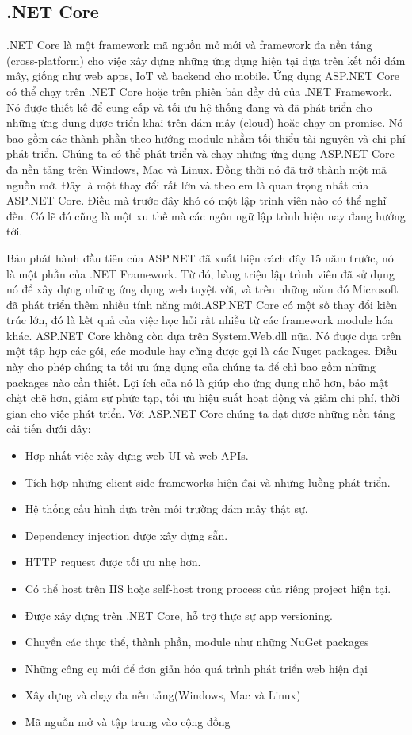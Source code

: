\subsection{.NET Core}
.NET Core là một framework mã nguồn mở mới và framework đa nền tảng (cross-platform) cho việc xây dựng những ứng dụng hiện tại dựa trên kết nối đám mây, giống như web apps, IoT và backend cho mobile. Ứng dụng ASP.NET Core có thể chạy trên .NET Core hoặc trên phiên bản đầy đủ của .NET Framework. Nó được thiết kế để cung cấp và tối ưu hệ thống đang và đã phát triển cho những ứng dụng được triển khai trên đám mây (cloud) hoặc chạy on-promise. Nó bao gồm các thành phần theo hướng module nhằm tối thiểu tài nguyên và chi phí phát triển. Chúng ta có thể phát triển và chạy những ứng dụng ASP.NET Core đa nền tảng trên Windows, Mac và Linux. Đồng thời nó đã trở thành một mã nguồn mở. Đây là một thay đổi rất lớn và theo em là quan trọng nhất của ASP.NET Core. Điều mà trước đây khó có một lập trình viên nào có thể nghĩ đến. Có lẽ đó cũng là một xu thế mà các ngôn ngữ lập trình hiện nay đang hướng tới.
\par
Bản phát hành đầu tiên của ASP.NET đã xuất hiện cách đây 15 năm trước, nó là một phần của .NET Framework. Từ đó, hàng triệu lập trình viên đã sử dụng nó để xây dựng những ứng dụng web tuyệt vời, và trên những năm đó Microsoft đã phát triển thêm nhiều tính năng mới.ASP.NET Core có một số thay đổi kiến trúc lớn, đó là kết quả của việc học hỏi rất nhiều từ các framework module hóa khác. ASP.NET Core không còn dựa trên System.Web.dll nữa. Nó được dựa trên một tập hợp các gói, các module hay cũng được gọi là các Nuget packages. Điều này cho phép chúng ta tối ưu ứng dụng của chúng ta để chỉ bao gồm những packages nào cần thiết. Lợi ích của nó là giúp cho ứng dụng nhỏ hơn, bảo mật chặt chẽ hơn, giảm sự phức tạp, tối ưu hiệu suất hoạt động và giảm chi phí, thời gian cho việc phát triển. Với ASP.NET Core chúng ta đạt được những nền tảng cải tiến dưới đây:
\begin{itemize}
\item Hợp nhất việc xây dựng web UI và web APIs.
\item Tích hợp những client-side frameworks hiện đại và những luồng phát triển.
\item Hệ thống cấu hình dựa trên môi trường đám mây thật sự.
\item Dependency injection được xây dựng sẵn.
\item HTTP request được tối ưu nhẹ hơn.
\item Có thể host trên IIS hoặc self-host trong process của riêng project hiện tại.
\item Được xây dựng trên .NET Core, hỗ trợ thực sự app versioning.
\item Chuyển các thực thể, thành phần, module như những NuGet packages
\item Những công cụ mới để đơn giản hóa quá trình phát triển web hiện đại
\item Xây dựng và chạy đa nền tảng(Windows, Mac và Linux)
\item Mã nguồn mở và tập trung vào cộng đồng
\end{itemize}
